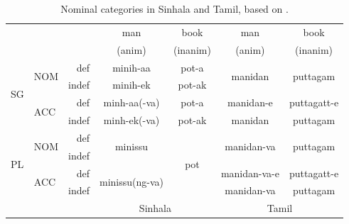 \documentclass[a4paper,10pt]{article}
\renewcommand{\L}{\lz}
\begin{document}
\begin{table}
\begin{tabular}{llr|c|c||c|c}
                             &                         &       & man                       & book       &  man                   & book              \\
                             &                         &       & (anim)                    & (inanim)   &  (anim)                & (inanim)            \\
\hline
\multirow{4}{*}{SG} & \multirow{2}{*}{NOM} & def   & minih-aa                        & pot-a               &  \multirow{2}{*}{manidan}    & \multirow{2}{*}{puttagam}\\
\cline{4-5}
                            &                         & indef & minih-ek                        & pot-ak              &                              &                          \\
\cline{4-5}\cline{6-7}
                            & \multirow{2}{*}{ACC} & def   & minh-aa(-va)                    & pot-a               &  manidan-e                   & puttagatt-e              \\
\cline{4-5}\cline{6-7}
                            &                         & indef & minh-ek(-va)                    & pot-ak              &  manidan                     & puttagam                 \\
\hline
\multirow{4}{*}{PL}   & \multirow{2}{*}{NOM} & def   & \multirow{2}{*}{minissu}        & \multirow{4}{*}{pot}&  \multirow{2}{*}{manidan-va} & \multirow{2}{*}{puttagam}\\

                            &                         & indef &                                 &                     &                              &                          \\
\cline{4-4}\cline{6-7}
                            & \multirow{2}{*}{ACC} & def   & \multirow{2}{*}{minissu(ng-va)} &                     &  manidan-va\L{}-e               & puttagatt-e              \\
\cline{6-7}
                            &                         & indef &                                 &                     &  manidan-va                  & puttagam                 \\
\cline{4-7}
                             &                         &       & \multicolumn{2}{c||}{Sinhala}                        & \multicolumn{2}{c}{Tamil} 
\end{tabular}
\caption{Nominal categories in Sinhala and Tamil, based on \citet[6,8]{Smith2003timing}.}
\label{tab:nominalmarkingSINTAM}
\end{table}
\end{document}
